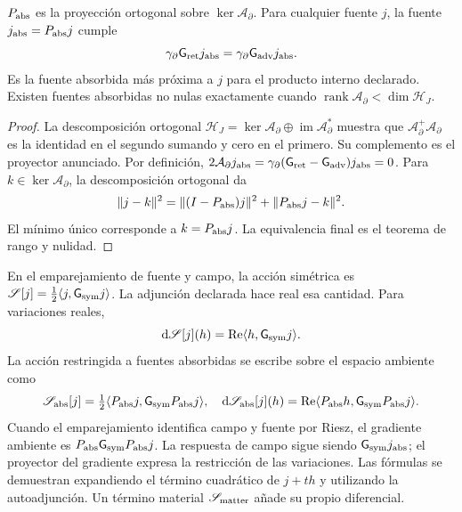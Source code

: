 \begin{theorem}
\label{vii:thm:proyeccion-absorcion}
\(P_{\rm abs}\) es la proyección ortogonal sobre
\(\ker\mathcal A_\partial\). Para cualquier fuente \(j\), la fuente
\(j_{\rm abs}=P_{\rm abs}j\) cumple
\begin{equation}
 \gamma_\partial \mathsf{G}_{\rm ret}j_{\rm abs}
 =\gamma_\partial \mathsf{G}_{\rm adv}j_{\rm abs}.
 \label{vii:eq:igualdad-borde-absorbido}
\end{equation}
Es la fuente absorbida más próxima a \(j\) para el producto interno
declarado. Existen fuentes absorbidas no nulas exactamente cuando
\(\operatorname{rank}\mathcal A_\partial<\dim\mathcal H_J\).
\end{theorem}
\begin{proof}
La descomposición ortogonal
\(\mathcal H_J=\ker\mathcal A_\partial\oplus
 \operatorname{im}\mathcal A_\partial^*\) muestra que
\(\mathcal A_\partial^+\mathcal A_\partial\) es la identidad
en el segundo sumando y cero en el primero. Su complemento es el
proyector anunciado. Por definición,
\(2\mathcal A_\partial j_{\rm abs}
 =\gamma_\partial(\mathsf{G}_{\rm ret}-\mathsf{G}_{\rm adv})j_{\rm abs}=0\).
Para \(k\in\ker\mathcal A_\partial\), la descomposición ortogonal da
\[
 \|j-k\|^2=\|(I-P_{\rm abs})j\|^2+\|P_{\rm abs}j-k\|^2.
\]
El mínimo único corresponde a \(k=P_{\rm abs}j\).
La equivalencia final es el teorema de rango y nulidad.
\end{proof}

En el emparejamiento de fuente y campo, la acción simétrica es
\(\mathscr S[j]=\tfrac12\langle j,\mathsf{G}_{\rm sym}j\rangle\).
La adjunción declarada hace real esa cantidad. Para variaciones reales,
\[
 \mathrm d\mathscr S[j](h)
 =\operatorname{Re}\langle h,\mathsf{G}_{\rm sym}j\rangle.
\]
La acción restringida a fuentes absorbidas se escribe sobre el espacio
ambiente como
\begin{equation}
 \mathscr S_{\rm abs}[j]
 =\tfrac12\langle P_{\rm abs}j,\mathsf{G}_{\rm sym}P_{\rm abs}j\rangle,
 \quad
 \mathrm d\mathscr S_{\rm abs}[j](h)
 =\operatorname{Re}\langle P_{\rm abs}h,\mathsf{G}_{\rm sym}P_{\rm abs}j\rangle.
 \label{vii:eq:variacion-restringida-absorcion}
\end{equation}
Cuando el emparejamiento identifica campo y fuente por Riesz, el gradiente
ambiente es \(P_{\rm abs}\mathsf{G}_{\rm sym}P_{\rm abs}j\).
La respuesta de campo sigue siendo \(\mathsf{G}_{\rm sym}j_{\rm abs}\); el
proyector del gradiente expresa la restricción de las variaciones.
Las fórmulas se demuestran expandiendo el término cuadrático de
\(j+th\) y utilizando la autoadjunción. Un término material
\(\mathscr S_{\rm matter}\) añade su propio diferencial.

